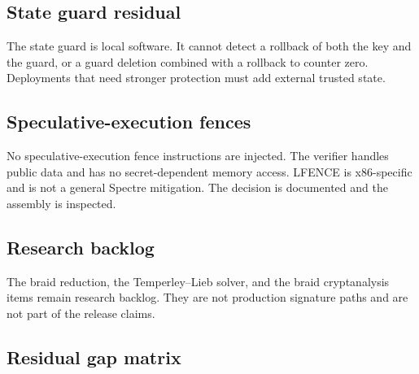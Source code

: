 \documentclass[11pt,a4paper]{article}
\begin{document}
\subsection{State guard residual}

The state guard is local software. It cannot detect a rollback of both the key
and the guard, or a guard deletion combined with a rollback to counter zero.
Deployments that need stronger protection must add external trusted state.

\subsection{Speculative-execution fences}

No speculative-execution fence instructions are injected. The verifier handles
public data and has no secret-dependent memory access. LFENCE is
x86-specific and is not a general Spectre mitigation. The decision is
documented and the assembly is inspected.

\subsection{Research backlog}

The braid reduction, the Temperley--Lieb solver, and the braid cryptanalysis
items remain research backlog. They are not production signature paths and are
not part of the release claims.

\clearpage
\subsection{Residual gap matrix}
\end{document}
